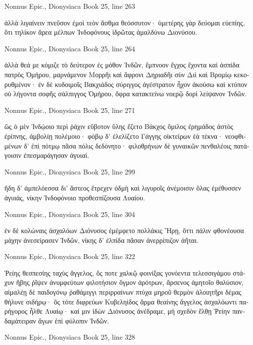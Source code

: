 \documentclass[12pt,letterpaper,twoside,final]{memoir}
\begin{document}
\begin{greek}
Nonnus Epic., Dionysiaca 
Book 25, line 263

                                         ἀλλὰ λιγαίνειν   
πνεῦσον ἐμοὶ τεὸν ἄσθμα θεόσσυτον· ὑμετέρης γὰρ 
δεύομαι εὐεπίης, ὅτι τηλίκον ἄρεα μέλπων 
Ἰνδοφόνους ἱδρῶτας ἀμαλδύνω Διονύσου. 



Nonnus Epic., Dionysiaca 
Book 25, line 264

ἀλλὰ θεά με κόμιζε τὸ δεύτερον ἐς μόθον Ἰνδῶν, 
ἔμπνοον ἔγχος ἔχοντα καὶ ἀσπίδα πατρὸς Ὁμήρου, 
μαρνάμενον Μορρῆι καὶ ἄφρονι Δηριαδῆι 
σὺν Διὶ καὶ Βρομίῳ κεκορυθμένον· ἐν δὲ κυδοιμοῖς 
Βακχιάδος σύριγγος ἀγέστρατον ἦχον ἀκούσω 
καὶ κτύπον οὐ λήγοντα σοφῆς σάλπιγγος Ὁμήρου, 
ὄφρα κατακτείνω νοερῷ δορὶ λείψανον Ἰνδῶν. 



Nonnus Epic., Dionysiaca 
Book 25, line 271

ὣς ὁ μὲν Ἰνδῴοιο περὶ ῥάχιν εὔβοτον ὕλης 
ἕζετο Βάκχος ὅμιλος ἐρημάδος ἀστὸς ἐρίπνης, 
ἀμβολίῃ πολέμοιο· φόβῳ δ' ἐλελίζετο Γάγγης 
οἰκτείρων ἑὰ τέκνα· νεοφθιμένων δ' ἐπὶ πότμῳ 
πᾶσα πόλις δεδόνητο· φιλοθρήνων δὲ γυναικῶν 
πενθαλέοις πατάγοισιν ἐπεσμαράγησαν ἀγυιαί. 



Nonnus Epic., Dionysiaca 
Book 25, line 299

ἤδη δ' ἀμπελόεσσα δι' ἄστεος ἔτρεχεν ὀδμὴ 
καὶ λιγυροῖς ἀνέμοισιν ὅλας ἐμέθυσσεν ἀγυιάς, 
νίκην Ἰνδοφόνοιο προθεσπίζουσα Λυαίου. 



Nonnus Epic., Dionysiaca 
Book 25, line 304

                                  ἐν δὲ κολώναις 
ἀσχαλόων Διόνυσος ἐμέμφετο πολλάκις Ἥρῃ, 
ὅττι πάλιν φθονέουσα μάχην ἀνεσείρασεν Ἰνδῶν, 
νίκης δ' ἐλπίδα πᾶσαν ἀνερρίπιζον ἀῆται. 



Nonnus Epic., Dionysiaca 
Book 25, line 322

Ῥείης θεσπεσίης ταχὺς ἄγγελος, ὅς ποτε χαλκῷ 
φοινίξας γονόεντα τελεσσιγάμου στάχυν ἥβης 
ῥῖψεν ἀνυμφεύτων φιλοτήσιον ὄγμον ἀρότρων, 
ἄρσενος ἀμητοῖο θαλύσιον, αἱμαλέῃ δὲ 
παιδογόνῳ ῥαθάμιγγι περιρραίνων πτύχα μηροῦ 
θερμὸν ἀλοιητῆρι δέμας θήλυνε σιδήρῳ· 
ὃς τότε διφρεύων Κυβεληίδος ἅρμα θεαίνης 
ἄγγελος ἀσχαλόωντι παρήγορος ἦλθε Λυαίῳ· 
καί μιν ἰδὼν Διόνυσος ἀνέδραμε, μὴ σχεδὸν ἔλθῃ 
Ῥείην πανδαμάτειραν ἄγων ἐπὶ φύλοπιν Ἰνδῶν. 



Nonnus Epic., Dionysiaca 
Book 25, line 328


\end{greek}
\end{document}
